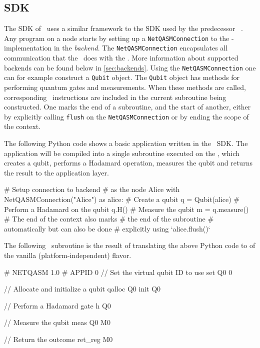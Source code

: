 \subsection{SDK}
\label{sec:sdk}
The SDK of \netqasm\ uses a similar framework to the SDK used by the predecessor \cqc~\cite{git_cqc}.
Any program on a node starts by setting up a \texttt{NetQASMConnection} to the \QNPU-implementation in the \emph{backend}.
The \texttt{NetQASMConnection} encapsulates all communication that the \host\ does with the \QNPU.
More information about supported backends can be found below in \cref{sec:backends}.
Using the \texttt{NetQASMConnection} one can for example construct a \texttt{Qubit} object.
The \texttt{Qubit} object has methods for performing quantum gates and measurements.
When these methods are called, corresponding \netqasm\ instructions are included in the current subroutine being constructed.
One marks the end of a subroutine, and the start of another, either by explicitly calling \texttt{flush} on the \texttt{NetQASMConnection} or by ending the scope of the  context.

The following Python code shows a basic application written in the \netqasm\ SDK.
The application will be compiled into a single subroutine executed on the \QNPU, which creates a qubit, performs a Hadamard operation, measures the qubit and returns the result to the application layer.
\begin{pycode}
  # Setup connection to backend
  # as the node Alice
  with NetQASMConnection("Alice") as alice:
    # Create a qubit
    q = Qubit(alice)
    # Perform a Hadamard on the qubit
    q.H()
    # Measure the qubit
    m = q.measure()
    # The end of the context also marks
    # the end of the subroutine
    # automatically but can also be done
    # explicitly using `alice.flush()`
\end{pycode}

The following \netqasm\ subroutine is the result of translating the above Python code to \netqasm of the vanilla (platform-independent) flavor.

\begin{nqcode}
  # NETQASM 1.0
  # APPID 0
  // Set the virtual qubit ID to use
  set Q0 0

  // Allocate and initialize a qubit
  qalloc Q0
  init Q0

  // Perform a Hadamard gate
  h Q0

  // Measure the qubit
  meas Q0 M0

  // Return the outcome
  ret_reg M0
\end{nqcode}

